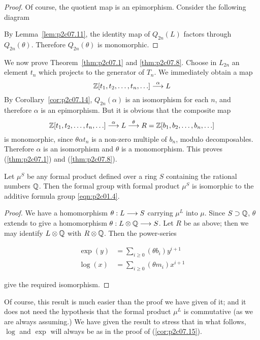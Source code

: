 \documentclass[../main]{subfiles}
\begin{document}
\begin{proof}
Of course, the quotient map is an epimorphism. Consider the following diagram

\begin{center}
\end{center}

By Lemma~\ref{lem:p2c07.11}, the identity map of $Q_{2n}(L)$ factors through $Q_{2n}(\theta)$. Therefore $Q_{2n}(\theta)$ is monomorphic.
\end{proof}

We now prove Theorem~\ref{thm:p2c07.1} and \ref{thm:p2c07.8}. Choose in $L_{2n}$ an element $t_n$ which projects to the generator of $T_n$. We immediately obtain a map $$\mathbb{Z} [t_1, t_2, \ldots, t_n, \ldots] \overset{\alpha}{\longrightarrow} L$$ By Corollary~\ref{cor:p2c07.14}, $Q_{2n}(\alpha)$ is an isomorphism for each $n$, and therefore $\alpha$ is an epimorphism. But it is obvious that the composite map $$\mathbb{Z}[t_1, t_2, \ldots, t_n, \ldots] \overset{\alpha}{\longrightarrow} L \overset{\theta}{\longrightarrow} R = \mathbb{Z}[b_1, b_2, \ldots, b_n, \ldots]$$ is monomorphic, since $\theta \alpha t_n$ is a non-zero multiple of $b_n$, modulo decomposables. Therefore $\alpha$ is an isomorphism and $\theta$ is a monomorphism. This proves (\ref{thm:p2c07.1}) and (\ref{thm:p2c07.8}). 

\begin{corollary}
\label{cor:p2c07.15}
Let $\mu^S$ be any formal product defined over a ring $S$ containing the rational numbers $\mathbb{Q}$. Then the formal group with formal product $\mu^S$ is isomorphic to the additive formula group \eqref{eqn:p2c01.4}.
\end{corollary}

\begin{proof}
We have a homomorphism $\theta : L \overset{}{\longrightarrow} S$ carrying $\mu^L$ into $\mu$. Since $S \supset \mathbb{Q}$, $\theta$ extends to give a homomorphism $\theta : L \otimes \mathbb{Q} \overset{}{\longrightarrow} S$. Let $R$ be as above; then we may identify $L \otimes \mathbb{Q}$ with $R \otimes \mathbb{Q}$. Then the power-series

\begin{align*}
\exp(y) & = \sum_{i \ge 0} (\theta b_i) y^{i + 1} \\ \log(x) & = \sum_{i \ge 0} (\theta m_i) x^{i + 1}
\end{align*}

give the required isomorphism.
\end{proof}

Of course, this result is much easier than the proof we have given of it; and it does not need the hypothesis that the formal product $\mu^L$ is commutative (as we are always assuming.) We have given the result to stress that in what follows, $\log$ and $\exp$ will always be as in the proof of (\ref{cor:p2c07.15}). 
\end{document}
